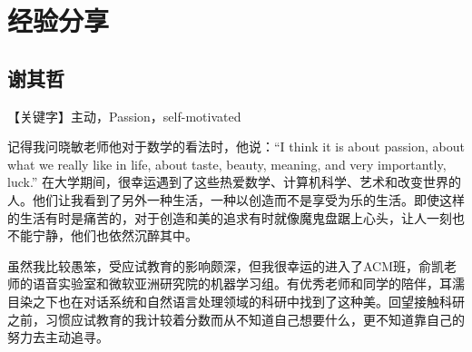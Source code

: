 \documentclass{vivid_layout}
\begin{document}

\section{经验分享}
\addtocounter{section}{1}
\setcounter{subsection}{0}

\subsection{{ 谢其哲}}

【关键字】主动，Passion，self-motivated

记得我问晓敏老师他对于数学的看法时，他说：“I think it is about passion, about what we really like in life, about taste, beauty, meaning, and very importantly, luck.” 在大学期间，很幸运遇到了这些热爱数学、计算机科学、艺术和改变世界的人。他们让我看到了另外一种生活，一种以创造而不是享受为乐的生活。即使这样的生活有时是痛苦的，对于创造和美的追求有时就像魔鬼盘踞上心头，让人一刻也不能宁静，他们也依然沉醉其中。

虽然我比较愚笨，受应试教育的影响颇深，但我很幸运的进入了ACM班，俞凯老师的语音实验室和微软亚洲研究院的机器学习组。有优秀老师和同学的陪伴，耳濡目染之下也在对话系统和自然语言处理领域的科研中找到了这种美。回望接触科研之前，习惯应试教育的我计较着分数而从不知道自己想要什么，更不知道靠自己的努力去主动追寻。
\end{document}
